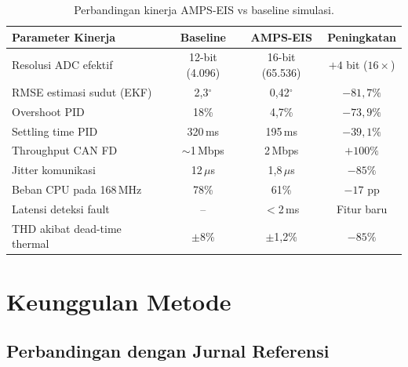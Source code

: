 \documentclass[12pt,a4paper]{article}
\begin{document}
\begin{table}[H]
\centering\small
\caption{Perbandingan kinerja AMPS-EIS vs baseline simulasi.}
\label{tab:hasil}
\setlength{\tabcolsep}{6pt}
\begin{tabularx}{\textwidth}{@{} X c c c @{}}
\toprule
\textbf{Parameter Kinerja}    & \textbf{Baseline}     & \textbf{AMPS-EIS}   & \textbf{Peningkatan}\\
\midrule
Resolusi ADC efektif          & 12-bit (4.096)        & 16-bit (65.536)     & $+4$ bit ($16\times$)\\
RMSE estimasi sudut (EKF)     & 2{,}3$^\circ$         & 0{,}42$^\circ$      & $-81{,}7\%$\\
Overshoot PID                 & 18\%                  & 4{,}7\%             & $-73{,}9\%$\\
Settling time PID             & 320\,ms               & 195\,ms             & $-39{,}1\%$\\
Throughput CAN FD             & $\sim$1\,Mbps         & 2\,Mbps             & $+100\%$\\
Jitter komunikasi             & 12\,$\mu$s            & 1{,}8\,$\mu$s       & $-85\%$\\
Beban CPU pada 168\,MHz       & 78\%                  & 61\%                & $-17$ pp\\
Latensi deteksi fault         & --                    & $<$2\,ms            & Fitur baru\\
THD akibat dead-time thermal  & $\pm$8\%              & $\pm$1{,}2\%        & $-85\%$\\
\bottomrule
\end{tabularx}
\end{table}

\newpage
\section{Keunggulan Metode}
\label{sec:keunggulan}

\subsection{Perbandingan dengan Jurnal Referensi}
\end{document}

